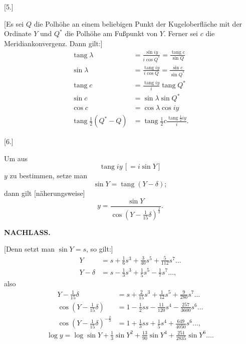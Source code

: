 \begin{center}[5.]\end{center}
[Es sei \(Q\) die Polhöhe an einem beliebigen Punkt der Kugeloberfläche
mit der Ordinate \(Y\) und \(Q^{*}\) die Polhöhe am Fußpunkt von \(Y\).
Ferner sei \(c\) die Meridiankonvergenz. Dann gilt:]
\[
\begin{aligned}
\operatorname{tang}\lambda&=\frac{\sin iy}{i\cos Q^{*}}=\frac{\operatorname{tang}c}{\sin Q}\\
\sin\lambda&=\frac{\operatorname{tang}iy}{i\cos Q}=\frac{\sin c}{\sin Q^{*}}\\
\operatorname{tang}c&=\frac{\operatorname{tang}iy}{i}\operatorname{tang} Q^{*}\\
\sin c&=\sin\lambda\sin Q^{*}\\
\cos c&=\cos\lambda\cos iy\\
\operatorname{tang}\tfrac12(Q^{*}-Q)&=\operatorname{tang}\tfrac12c
 \frac{\operatorname{tang}\tfrac12iy}{i}.
\end{aligned}
\]

\begin{center}[6.]\end{center}
Um aus
\[
\operatorname{tang}iy\,[=i\sin Y]
\]
\noindent \(y\) zu bestimmen, setze man
\[
\sin Y=\operatorname{tang}(Y-\delta);
\]
\noindent dann gilt [näherungsweise]
\[
y=\frac{\sin Y}{\cos(Y-\tfrac1{15}\delta)^{\frac23}}.
\]

\par\clearpage
\noindent{}\hfill{\small\textbf{NACHLASS.}}\hfill\null\par\medskip

[Denn setzt man \(\sin Y=s\), so gilt:]
\[
\begin{aligned}
Y&=s+\tfrac16s^3+\tfrac3{40}s^5+\tfrac5{112}s^7\ldots\\
Y-\delta&=s-\tfrac13s^3+\tfrac15s^5-\tfrac17s^7\ldots,
\end{aligned}
\]
\noindent also
\[
\begin{aligned}
Y-\tfrac1{15}\delta&=s+\tfrac2{15}s^3+\tfrac1{12}s^5+\tfrac9{280}s^7\ldots\\
\cos(Y-\tfrac1{15}\delta)&=1-\tfrac12ss-\tfrac{11}{120}s^4-\tfrac{257}{3600}s^6\ldots\\
\cos(Y-\tfrac1{15}\delta)^{-\frac23}&=1+\tfrac13ss+\tfrac15s^4+\tfrac{649}{4050}s^6\ldots,
\end{aligned}
\]
\[
\log y=\log\sin Y+\tfrac13\sin Y^2+\tfrac{13}{90}\sin Y^4+
 \tfrac{251}{2835}\sin Y^6\ldots.
\]

